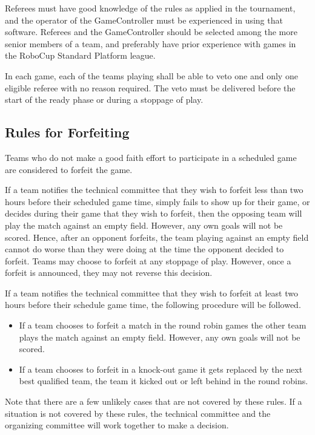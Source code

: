 Referees must have good knowledge of the rules as applied in the tournament, and the operator of the GameController must be experienced in using that software. Referees and the GameController should be selected among the more senior members of a team, and preferably have prior experience with games in the RoboCup Standard Platform league.

In each game, each of the teams playing shall be able to veto one and only one eligible referee with no reason required. The veto must be delivered before the start of the ready phase or during a stoppage of play.

\subsection{Rules for Forfeiting}
\label{sec:forfeit}

Teams who do not make a good faith effort to participate in a scheduled game are considered to forfeit the game.

If a team notifies the technical committee that they wish to forfeit less than two hours before their scheduled game time, simply fails to show up for their game, or decides during their game that they wish to forfeit, then the opposing team will play the match against an empty field.  However, any own goals will not be scored.  Hence, after an opponent forfeits, the team playing against an empty field cannot do worse than they were doing at the time the opponent decided to forfeit.  Teams may choose to forfeit at any stoppage of play.  However, once a forfeit is announced, they may not reverse this decision.

If a team notifies the technical committee that they wish to forfeit at least two hours before their schedule game time, the following procedure will be followed.

\begin{itemize}
  \item If a team chooses to forfeit a match in the round robin games the other team plays the match against an empty field.  However, any own goals will not be scored.
  \item If a team chooses to forfeit in a knock-out game it gets replaced by the next best qualified team, \ie the team it kicked out or left behind in the round robins.
\end{itemize}

Note that there are a few unlikely cases that are not covered by these rules.  If a situation is not covered by these rules, the technical committee and the organizing committee will work together to make a decision.

